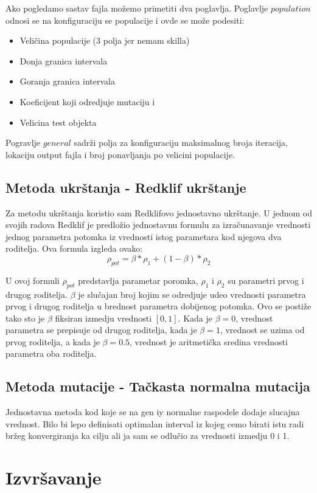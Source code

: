 \documentclass[a4paper,11pt]{book}
\begin{document}
Ako pogledamo sastav fajla možemo primetiti dva poglavlja. Poglavlje $population$ odnosi se na konfiguraciju se populacije i ovde se može podesiti:

\begin{itemize}
  \item Veličina populacije (3 polja jer nemam skilla)
  \item Donja granica intervala
  \item Goranja granica intervala
  \item Koeficijent koji odredjuje mutaciju i 
  \item Velicina test objekta
\end{itemize}
 
Pogravlje $general$ sadrži polja za konfiguraciju maksimalnog broja iteracija, lokaciju output fajla i broj ponavljanja po velicini populacije.


\section{Metoda ukrštanja - Redklif ukrštanje}

Za metodu ukrštanja koristio sam Redklifovo jednostavno ukrštanje. U jednom od svojih radova Redklif je predložio jednostavnu formulu za izračunavanje vrednosti jednog parametra potomka iz vrednosti istog parametara kod njegova dva roditelja. Ova formula izgleda ovako:
\[\rho_{pot} = \beta * \rho_{1} + (1-\beta) * \rho_{2}\]

U ovoj formuli $\rho_{pot}$ predstavlja parametar poromka, $\rho_{1}$ i $\rho_{2}$ su parametri prvog i drugog roditelja. $\beta$ je slučajan broj kojim se odredjuje udeo vrednosti parametra prvog i drugog roditelja u brednost parametra dobijenog potomka. Ovo se postiže tako sto je $\beta$ fiksiran izmedju vrednosti $[0,1]$. Kada je $\beta=0$, vrednost parametra se prepisuje od drugog roditelja, kada je $\beta=1$, vrednost se uzima od prvog roditelja, a kada je $\beta=0.5$, vrednost je aritmetička sredina vrednosti parametra oba roditelja.

\section{Metoda mutacije - Tačkasta normalna mutacija}

Jednostavna metoda kod koje se na gen iy normalne raspodele dodaje slucajna vrednost. Bilo bi lepo definisati optimalan interval iz kojeg cemo birati istu radi bržeg konvergiranja ka cilju ali ja sam se odlučio za vrednosti izmedju 0 i 1.

\chapter{Izvršavanje}
\end{document}
